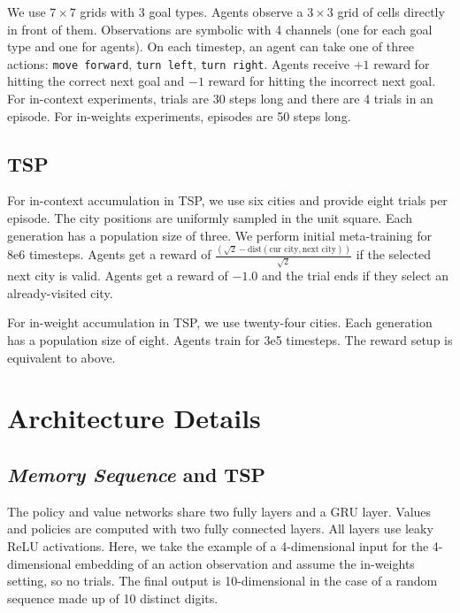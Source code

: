 \documentclass{article}
\begin{document}
We use $7 \times 7$ grids with 3 goal types. Agents observe a $3 \times 3$ grid of cells directly in front of them. Observations are symbolic with 4 channels (one for each goal type and one for agents). On each timestep, an agent can take one of three actions: \texttt{move forward}, \texttt{turn left}, \texttt{turn right}. Agents receive $+1$ reward for hitting the correct next goal and $-1$ reward for hitting the incorrect next goal. For in-context experiments, trials are 30 steps long and there are 4 trials in an episode. For in-weights experiments, episodes are 50 steps long. 

\subsection{TSP}

For in-context accumulation in TSP, we use six cities and provide eight trials per episode. The city positions are uniformly sampled in the unit square. Each generation has a population size of three. We perform initial meta-training for 8e6 timesteps. Agents get a reward of $\frac{(\sqrt{2} - \text{dist}(\text{cur city}, \text{next city}))}{ \sqrt{2}}$ if the selected next city is valid. Agents get a reward of $-1.0$ and the trial ends if they select an already-visited city. 

For in-weight accumulation in TSP, we use twenty-four cities. Each generation has a population size of eight. Agents train for 3e5 timesteps. The reward setup is equivalent to above.

\newpage
\section{Architecture Details}
\label{A:arch}

\subsection{\textit{Memory Sequence} and TSP}

The policy and value networks share two fully layers and a GRU layer. Values and policies are computed with two fully connected layers. All layers use leaky ReLU activations. Here, we take the example of a 4-dimensional input for the 4-dimensional embedding of an action observation and assume the in-weights setting, so no trials. The final output is 10-dimensional in the case of a random sequence made up of 10 distinct digits.
\end{document}
